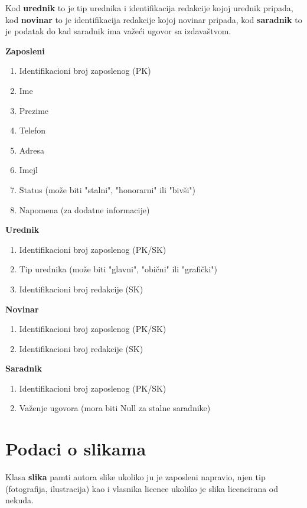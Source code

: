 Kod \textbf{urednik} to je tip urednika i identifikacija redakcije kojoj urednik pripada, kod \textbf{novinar}  to je  identifikacija redakcije kojoj novinar pripada, kod \textbf{saradnik} to je podatak do kad saradnik ima važeći ugovor sa izdavaštvom. \vspace{5mm}

\noindent \textbf{Zaposleni}
\begin{enumerate}
\item Identifikacioni broj zaposlenog (PK)
\item Ime
\item Prezime
\item Telefon
\item Adresa
\item  Imejl
\item Status (može biti "stalni", "honorarni" ili "bivši")
\item Napomena (za dodatne informacije)
\end{enumerate} \vspace{5mm}

\noindent \textbf{Urednik}
\begin{enumerate}
\item Identifikacioni broj zaposlenog (PK/SK)
\item Tip urednika (može biti "glavni", "obični" ili "grafički")
\item Identifikacioni broj redakcije (SK)
\end{enumerate} \vspace{5mm}

\noindent \textbf{Novinar}
\begin{enumerate}
\item Identifikacioni broj zaposlenog (PK/SK)
\item Identifikacioni broj redakcije (SK)
\end{enumerate} \vspace{5mm}

\noindent \textbf{Saradnik}
\begin{enumerate}
\item Identifikacioni broj zaposlenog (PK/SK)
\item Važenje ugovora (mora biti Null za stalne saradnike)
\end{enumerate} \vspace{5mm}

\section{Podaci o slikama}
Klasa \textbf{slika} pamti autora slike ukoliko ju je zaposleni napravio, njen tip (fotografija, ilustracija) kao i vlasnika licence ukoliko je slika licencirana od nekuda. 

